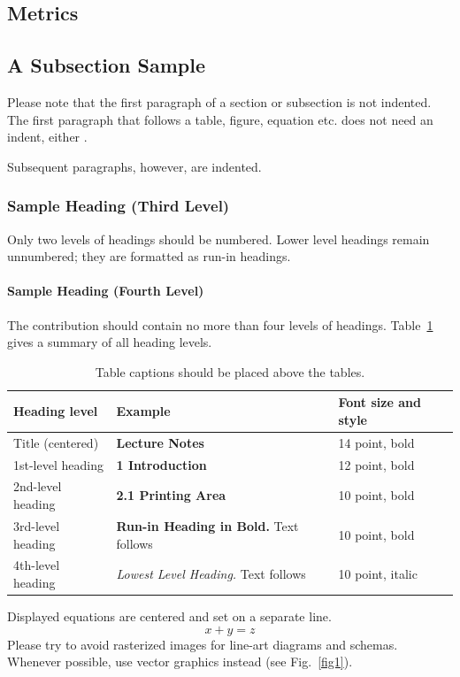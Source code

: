 \documentclass[runningheads]{llncs}
\begin{document}
\subsection{Metrics}

\subsection{A Subsection Sample}
Please note that the first paragraph of a section or subsection is
not indented. The first paragraph that follows a table, figure,
equation etc. does not need an indent, either \cite{test1}.

Subsequent paragraphs, however, are indented.

\subsubsection{Sample Heading (Third Level)} Only two levels of
headings should be numbered. Lower level headings remain unnumbered;
they are formatted as run-in headings.

\paragraph{Sample Heading (Fourth Level)}
The contribution should contain no more than four levels of
headings. Table~\ref{tab1} gives a summary of all heading levels.

\begin{table}
\caption{Table captions should be placed above the
tables.}\label{tab1}
\begin{tabular}{|l|l|l|}
\hline
Heading level &  Example & Font size and style\\
\hline
Title (centered) &  {\Large\bfseries Lecture Notes} & 14 point, bold\\
1st-level heading &  {\large\bfseries 1 Introduction} & 12 point, bold\\
2nd-level heading & {\bfseries 2.1 Printing Area} & 10 point, bold\\
3rd-level heading & {\bfseries Run-in Heading in Bold.} Text follows & 10 point, bold\\
4th-level heading & {\itshape Lowest Level Heading.} Text follows & 10 point, italic\\
\hline
\end{tabular}
\end{table}


\noindent Displayed equations are centered and set on a separate
line.
\begin{equation}
x + y = z
\end{equation}
Please try to avoid rasterized images for line-art diagrams and
schemas. Whenever possible, use vector graphics instead (see
Fig.~\ref{fig1}).
\end{document}
